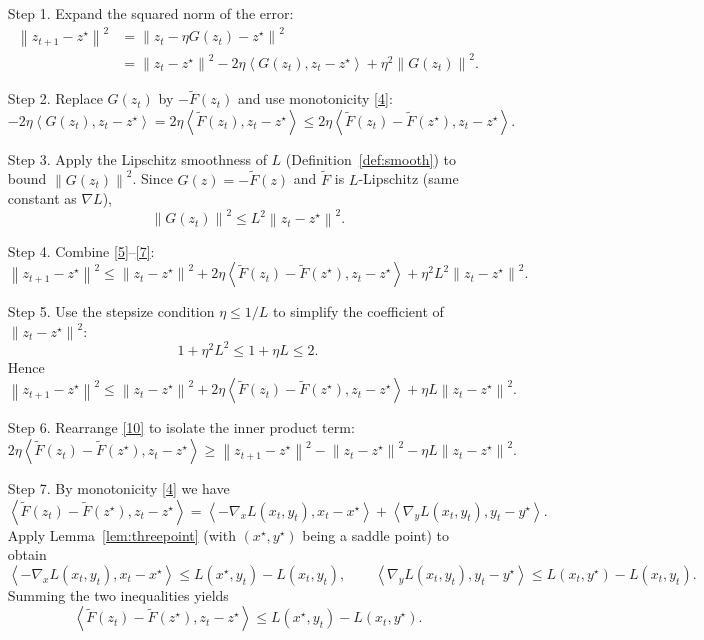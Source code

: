 \documentclass{article}
\newcommand{\norm}[1]{\left\lVert#1\right\rVert}
\newcommand{\inner}[2]{\left\langle #1,#2\right\rangle}
\begin{document}
\begin{enumerate}
\item[Step 1.] Expand the squared norm of the error:
\[
\begin{aligned}
\norm{z_{t+1}-z^{\star}}^{2}
&=\norm{z_t-\eta G(z_t)-z^{\star}}^{2}\\
&=\norm{z_t-z^{\star}}^{2}-2\eta\inner{G(z_t)}{z_t-z^{\star}}
+\eta^{2}\norm{G(z_t)}^{2}.
\tag{5}
\end{aligned}
\]

\item[Step 2.] Replace $G(z_t)$ by $-\tilde{F}(z_t)$ and use monotonicity \eqref{4}:
\[
-2\eta\inner{G(z_t)}{z_t-z^{\star}}
=2\eta\inner{\tilde{F}(z_t)}{z_t-z^{\star}}
\le 2\eta\inner{\tilde{F}(z_t)-\tilde{F}(z^{\star})}{z_t-z^{\star}}.
\tag{6}
\]

\item[Step 3.] Apply the Lipschitz smoothness of $L$ (Definition~\ref{def:smooth}) to bound $\norm{G(z_t)}^{2}$.
Since $G(z)=-\tilde{F}(z)$ and $\tilde{F}$ is $L$‑Lipschitz (same constant as $\nabla L$),
\[
\norm{G(z_t)}^{2}\le L^{2}\norm{z_t-z^{\star}}^{2}.
\tag{7}
\]

\item[Step 4.] Combine \eqref{5}–\eqref{7}:
\[
\norm{z_{t+1}-z^{\star}}^{2}
\le \norm{z_t-z^{\star}}^{2}
+2\eta\inner{\tilde{F}(z_t)-\tilde{F}(z^{\star})}{z_t-z^{\star}}
+\eta^{2}L^{2}\norm{z_t-z^{\star}}^{2}.
\tag{8}
\]

\item[Step 5.] Use the stepsize condition $\eta\le 1/L$ to simplify the coefficient of $\norm{z_t-z^{\star}}^{2}$:
\[
1+\eta^{2}L^{2}\le 1+ \eta L \le 2.
\tag{9}
\]
Hence
\[
\norm{z_{t+1}-z^{\star}}^{2}
\le \norm{z_t-z^{\star}}^{2}
+2\eta\inner{\tilde{F}(z_t)-\tilde{F}(z^{\star})}{z_t-z^{\star}}
+ \eta L \norm{z_t-z^{\star}}^{2}.
\tag{10}
\]

\item[Step 6.] Rearrange \eqref{10} to isolate the inner product term:
\[
2\eta\inner{\tilde{F}(z_t)-\tilde{F}(z^{\star})}{z_t-z^{\star}}
\ge \norm{z_{t+1}-z^{\star}}^{2}-\norm{z_t-z^{\star}}^{2}-\eta L \norm{z_t-z^{\star}}^{2}.
\tag{11}
\]

\item[Step 7.] By monotonicity \eqref{4} we have 
\[
\inner{\tilde{F}(z_t)-\tilde{F}(z^{\star})}{z_t-z^{\star}}
= \inner{-\nabla_x L(x_t,y_t)}{x_t-x^{\star}}+\inner{\nabla_y L(x_t,y_t)}{y_t-y^{\star}}.
\tag{12}
\]
Apply Lemma~\ref{lem:threepoint} (with $(x^{\star},y^{\star})$ being a saddle point) to obtain
\[
\inner{-\nabla_x L(x_t,y_t)}{x_t-x^{\star}}
\le L(x^{\star},y_t)-L(x_t,y_t),\qquad
\inner{\nabla_y L(x_t,y_t)}{y_t-y^{\star}}
\le L(x_t,y^{\star})-L(x_t,y_t).
\tag{13}
\]
Summing the two inequalities yields
\[
\inner{\tilde{F}(z_t)-\tilde{F}(z^{\star})}{z_t-z^{\star}}
\le L(x^{\star},y_t)-L(x_t,y^{\star}).
\tag{14}
\]


\end{enumerate}
\end{document}

